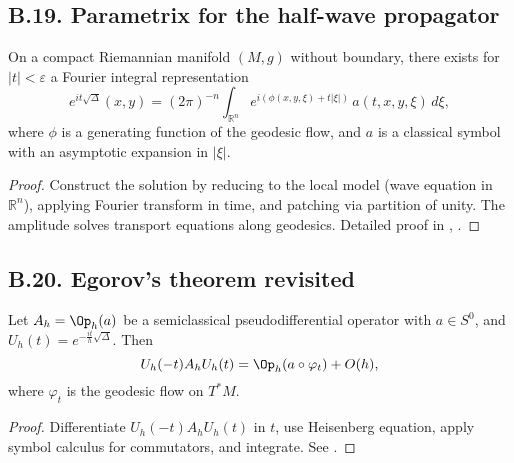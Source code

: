 
\subsection*{B.19. Parametrix for the half-wave propagator}
\label{appB:parametrix}

\begin{theorem}
\label{thm:parametrix}
On a compact Riemannian manifold $(M,g)$ without boundary, there exists for $|t|<\varepsilon$ a Fourier integral representation
\[
e^{it\sqrt{\Delta}}(x,y) = (2\pi)^{-n}\int_{\mathbb{R}^n} e^{i(\phi(x,y,\xi)+t|\xi|)}\,a(t,x,y,\xi)\, d\xi,
\]
where $\phi$ is a generating function of the geodesic flow, and $a$ is a classical symbol with an asymptotic expansion in $|\xi|$.
\end{theorem}

\begin{proof}
Construct the solution by reducing to the local model (wave equation in $\mathbb{R}^n$), applying Fourier transform in time, and patching via partition of unity. The amplitude solves transport equations along geodesics. Detailed proof in \cite[Chap.~VII]{HormanderIII}, \cite{Duistermaat}.
\end{proof}

\subsection*{B.20. Egorov’s theorem revisited}
\label{appB:egorov}

\begin{theorem}
\label{thm:egorov}
Let $A_h=\Op_h(a)$ be a semiclassical pseudodifferential operator with $a\in S^0$, and $U_h(t)=e^{-\tfrac{it}{h}\sqrt{\Delta}}$. Then
\[
U_h(-t)A_h U_h(t) = \Op_h(a\circ \varphi_t) + O(h),
\]
where $\varphi_t$ is the geodesic flow on $T^*M$.
\end{theorem}

\begin{proof}
Differentiate $U_h(-t)A_hU_h(t)$ in $t$, use Heisenberg equation, apply symbol calculus for commutators, and integrate. See \cite[Thm.~11.1]{Zworski}.
\end{proof}

